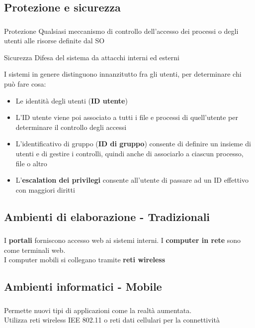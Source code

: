 \documentclass{beamer}
\newenvironment{mainframe}{
	\begin{frame}
		\frametitle{\insertsubsection}
		\framesubtitle{\insertsection}
	}{
	\end{frame}
}
\begin{document}
\subsection{Protezione e sicurezza}
\begin{mainframe}
	\begin{block}{Protezione}
		Qualsiasi meccanismo di controllo dell'accesso dei processi o degli utenti alle risorse definite dal SO
	\end{block}
	\begin{block}{Sicurezza}
		Difesa del sistema da attacchi interni ed esterni
	\end{block}
\end{mainframe}
\begin{frame}
	I sistemi in genere distinguono innanzitutto fra gli utenti, per determinare chi può fare cosa:
	\begin{itemize}
		\item Le identità degli utenti (\textbf{ID utente})
		\item L'ID utente viene poi associato a tutti i file e processi di quell'utente per determinare il controllo degli accessi
		\item L'identificativo di gruppo (\textbf{ID di gruppo}) consente di definire un insieme di utenti e di gestire i controlli, quindi anche di associarlo a ciascun processo, file o altro
		\item L'\textbf{escalation dei privilegi} consente all'utente di passare ad un ID effettivo con maggiori diritti
	\end{itemize}
\end{frame}
\subsection{Ambienti di elaborazione - Tradizionali}
\begin{mainframe}
	I \textbf{portali} forniscono accesso web ai sistemi interni. I \textbf{computer in rete} sono come terminali web.\\
	I computer mobili si collegano tramite \textbf{reti wireless}
\end{mainframe}
\subsection{Ambienti informatici - Mobile}
\begin{mainframe}
	Permette nuovi tipi di applicazioni come la realtà aumentata.\\
	Utilizza reti wireless IEE 802.11 o reti dati cellulari per la connettività
\end{mainframe}
\end{document}
